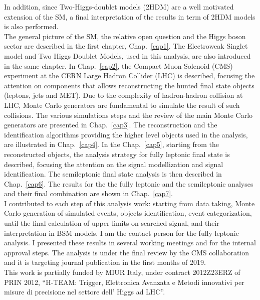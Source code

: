 \documentclass[PhD,binding=0.6cm]{../sapthesis}
\begin{document}
In addition, since  Two-Higgs-doublet models (2HDM)  are a well motivated extension of the SM, a final interpretation of the results in term of 2HDM models is also performed.\\
\newline
The general picture of the SM,  the relative open question and the Higgs boson sector  are described in the first chapter, Chap.~\ref{cap1}. 
The  Electroweak  Singlet model and Two Higgs Doublet Models, used in this analysis, are also introduced in the same chapter. 
In Chap.~\ref{cap2}, the Compact Muon Solenoid (CMS) experiment at the
CERN Large Hadron Collider (LHC) is described, focusing the attention
on components that allows reconstructing the hunted final state
objects (leptons, jets and MET).
Due to the complexity of  hadron-hadron collision at LHC, Monte Carlo generators are fundamental to simulate the result of such  collisions. 
The various simulations steps and the review of the main Monte Carlo generators are presented in Chap.~\ref{cap3}.
The reconstruction and the identification algorithms providing the
higher level objects used in the analysis, are illustrated in Chap.~\ref{cap4}.
In the Chap.~\ref{cap5}, starting from the reconstructed objects, the analysis strategy for fully leptonic final state  is described, focusing the attention on the signal  modellization and signal identification.
The semileptonic final state analysis is then described in Chap.~\ref{cap6}.
The results for the the fully leptonic and the semileptonic analyses and their final  combination are shown in Chap.~\ref{cap7}.\\
\newline
I contributed to each step of this analysis work: starting from data taking, Monte Carlo generation of simulated events, objects identification, event categorization, until the final calculation of upper limits on searched signal, and their interpretation in BSM models. I am the contact person for the fully leptonic analysis. I presented these results in several working meetings and for the internal approval steps. The analysis is under the final review  by the CMS collaboration and it is targeting journal publication in the first months of 2019.\\
\newline
This work is partially funded by MIUR Italy, under contract 2012Z23ERZ of PRIN 2012, ``H-TEAM: Trigger, Elettronica Avanzata e Metodi innovativi per misure di precisione nel settore dell’ Higgs ad LHC''.
\end{document}
